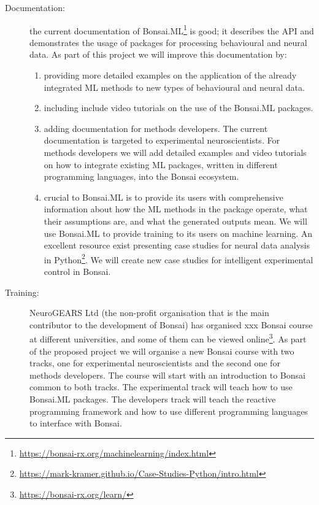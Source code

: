 \begin{description}

    \item[Documentation:] the current documentation of
        Bonsai.ML\footnote[8]{\url{https://bonsai-rx.org/machinelearning/index.html}}
        is good; it describes the API and demonstrates the usage of packages
        for processing behavioural and neural data. As part of this project we
        will improve this documentation by:

    \begin{enumerate}

        \item providing more detailed examples on the application of the
            already integrated ML methods to new types of behavioural and
            neural data.

        \item including include video tutorials on the use of the Bonsai.ML
            packages.

        \item adding documentation for methods developers. The current
            documentation is targeted to experimental neuroscientists. For
            methods developers we will add detailed examples and video
            tutorials on how to integrate existing ML packages, written in
            different programming languages, into the Bonsai ecosystem.

        \item crucial to Bonsai.ML is to provide its users with comprehensive
            information about how the ML methods in the package operate, what
            their assumptions are, and what the generated outputs mean. We will
            use Bonsai.ML to provide training to its users on machine learning.
            An excellent resource exist presenting case studies for neural data
            analysis in
            Python\footnote[9]{\url{https://mark-kramer.github.io/Case-Studies-Python/intro.html}}.
            We will create new case studies for intelligent experimental
            control in Bonsai.

    \end{enumerate}

    \item[Training:] NeuroGEARS Ltd (the non-profit organisation that is the
        main contributor to the development of Bonsai) has organised xxx Bonsai
        course at different universities, and some of them can be viewed
        online\footnote[10]{\url{https://bonsai-rx.org/learn/}}. As part of the
        proposed project we will organise a new Bonsai course with two tracks,
        one for experimental neuroscientists and the second one for methods
        developers. The course will start with an introduction to Bonsai common
        to both tracks. The experimental track will teach how to use Bonsai.ML
        packages. The developers track will teach the reactive programming
        framework and how to use different programming languages to interface
        with Bonsai.


\end{description}
